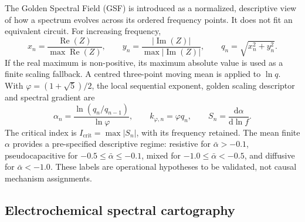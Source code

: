 \documentclass[a4paper,fleqn]{cas-sc}
\begin{document}
The Golden Spectral Field (GSF) is introduced as a normalized, descriptive view
of how a spectrum evolves across its ordered frequency points. It does not fit an
equivalent circuit. For increasing frequency,
\begin{equation}
 x_n=\frac{\operatorname{Re}(Z)}{\max\operatorname{Re}(Z)},\qquad
 y_n=\frac{|\operatorname{Im}(Z)|}{\max|\operatorname{Im}(Z)|},\qquad
 q_n=\sqrt{x_n^2+y_n^2}.
 \label{eq:gsf-normalization}
\end{equation}
If the real maximum is non-positive, its maximum absolute value is used as a
finite scaling fallback. A centred three-point moving mean is applied to
$\ln q$. With $\varphi=(1+\sqrt5)/2$, the local sequential exponent, golden
scaling descriptor and spectral gradient are
\begin{equation}
 \alpha_n=\frac{\ln(q_n/q_{n-1})}{\ln\varphi},\qquad
 k_{\varphi,n}=\varphi q_n,\qquad
 S_n=\frac{\mathrm d\alpha}{\mathrm d\ln f}.
 \label{eq:gsf-descriptors}
\end{equation}
The critical index is $I_{\mathrm{crit}}=\max|S_n|$, with its frequency retained.
The mean finite $\alpha$ provides a pre-specified descriptive regime:
resistive for $\bar\alpha>-0.1$, pseudocapacitive for
$-0.5\leq\bar\alpha\leq-0.1$, mixed for
$-1.0\leq\bar\alpha<-0.5$, and diffusive for $\bar\alpha<-1.0$. These labels are
operational hypotheses to be validated, not causal mechanism assignments.

\subsection{Electrochemical spectral cartography}\label{sec:esc}
\end{document}
